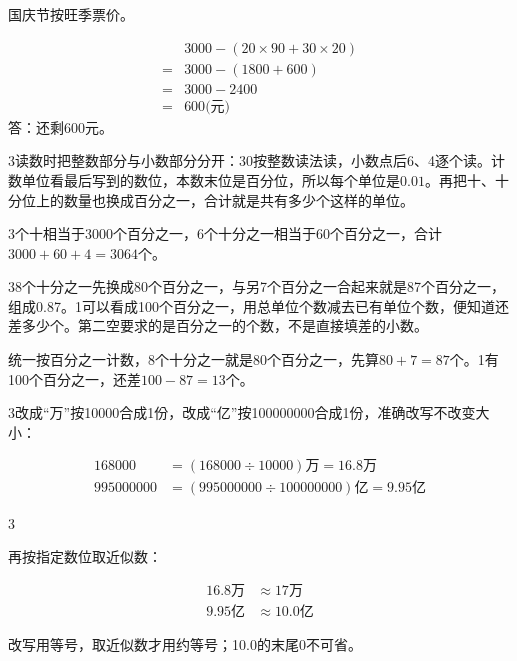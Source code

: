 \documentclass[multi=snippet,border={5bp 20bp 5bp 5bp}]{standalone}
\newenvironment{snippet}[3]{\begin{minipage}{#1bp}\color{answerred}\fontsize{#2}{#3}\selectfont\raggedright}{\end{minipage}}
\begin{document}
\begin{snippet}{264}{10.5}{12.8}\SourceSans\setlength{\mathindent}{2bp}国庆节按旺季票价。\par \[\begin{aligned}&3000-(20\times90+30\times20)\\={}&3000-(1800+600)\\={}&3000-2400\\={}&600\text{(元)}\end{aligned}\]答：还剩600元。\end{snippet}
\begin{snippet}{505}{11.5}{14}\begin{multicols}{3}\raggedcolumns 读数时把整数部分与小数部分分开：30按整数读法读，小数点后6、4逐个读。计数单位看最后写到的数位，本数末位是百分位，所以每个单位是\(0.01\)\allowbreak 。再把十、十分位上的数量也换成百分之一，合计就是共有多少个这样的单位。\par 3个十相当于3000个百分之一，6个十分之一相当于60个百分之一，合计\(3000+60+4=3064\)\allowbreak 个。\end{multicols}\end{snippet}
\begin{snippet}{505}{11.5}{14}\begin{multicols}{3}\raggedcolumns 8个十分之一先换成80个百分之一，与另7个百分之一合起来就是87个百分之一，组成0.87。1可以看成100个百分之一，用总单位个数减去已有单位个数，便知道还差多少个。第二空要求的是百分之一的个数，不是直接填差的小数。\par 统一按百分之一计数，8个十分之一就是80个百分之一，先算\(80+7=87\)\allowbreak 个。1有100个百分之一，还差\(100-87=13\)\allowbreak 个。\end{multicols}\end{snippet}
\begin{snippet}{505}{11.5}{14}\begin{multicols}{3}\raggedcolumns 改成“万”按10000合成1份，改成“亿”按100000000合成1份，准确改写不改变大小：\par\noindent\end{multicols}\[\displaystyle \begin{aligned}168000&=(168000\div10000)\text{万}=16.8\text{万}\\995000000&=(995000000\div100000000)\text{亿}=9.95\text{亿}\end{aligned}\]\begin{multicols}{3}\raggedcolumns \par 再按指定数位取近似数：\par\noindent\[\displaystyle \begin{aligned}16.8\text{万}&\approx17\text{万}\\9.95\text{亿}&\approx10.0\text{亿}\end{aligned}\]\par 改写用等号，取近似数才用约等号；10.0的末尾0不可省。\end{multicols}\end{snippet}
\end{document}

